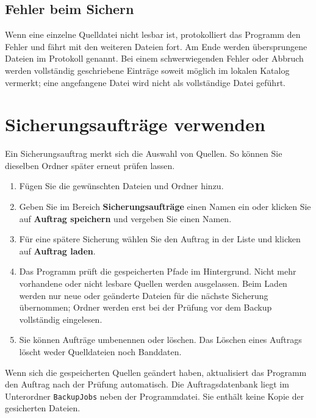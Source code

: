 \documentclass[11pt,a4paper]{article}
\begin{document}
\subsection{Fehler beim Sichern}
Wenn eine einzelne Quelldatei nicht lesbar ist, protokolliert das Programm den Fehler und fährt mit den weiteren Dateien fort. Am Ende werden übersprungene Dateien im Protokoll genannt. Bei einem schwerwiegenden Fehler oder Abbruch werden vollständig geschriebene Einträge soweit möglich im lokalen Katalog vermerkt; eine angefangene Datei wird nicht als vollständige Datei geführt.

\section{Sicherungsaufträge verwenden}
Ein Sicherungsauftrag merkt sich die Auswahl von Quellen. So können Sie dieselben Ordner später erneut prüfen lassen.
\begin{enumerate}
\item Fügen Sie die gewünschten Dateien und Ordner hinzu.
\item Geben Sie im Bereich \textbf{Sicherungsaufträge} einen Namen ein oder klicken Sie auf \textbf{Auftrag speichern} und vergeben Sie einen Namen.
\item Für eine spätere Sicherung wählen Sie den Auftrag in der Liste und klicken auf \textbf{Auftrag laden}.
\item Das Programm prüft die gespeicherten Pfade im Hintergrund. Nicht mehr vorhandene oder nicht lesbare Quellen werden ausgelassen. Beim Laden werden nur neue oder geänderte Dateien für die nächste Sicherung übernommen; Ordner werden erst bei der Prüfung vor dem Backup vollständig eingelesen.
\item Sie können Aufträge umbenennen oder löschen. Das Löschen eines Auftrags löscht weder Quelldateien noch Banddaten.
\end{enumerate}
Wenn sich die gespeicherten Quellen geändert haben, aktualisiert das Programm den Auftrag nach der Prüfung automatisch. Die Auftragsdatenbank liegt im Unterordner \texttt{BackupJobs} neben der Programmdatei. Sie enthält keine Kopie der gesicherten Dateien.
\end{document}
